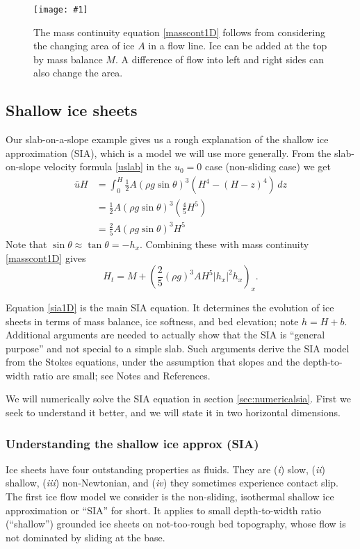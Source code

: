 \documentclass[titlepage,letterpaper,final,12pt]{scrartcl}
\newcommand{\onefigsize}[3]{
\begin{figure}[ht]
\centering
\texttt{[image: \#1]}
\caption{#2}
\label{fig:#1}
\end{figure}}
\newcommand{\onefig}[2]{\onefigsize{#1}{#2}{3.0in}}
\begin{document}
\onefig{slabmasscontfig}{The mass continuity equation \eqref{masscont1D} follows from considering the changing area of ice $A$ in a flow line.  Ice can be added at the top by mass balance $M$.  A difference of flow into left and right sides can also change the area.}


\subsection{Shallow ice sheets}  Our slab-on-a-slope example gives us a rough explanation of the shallow ice approximation (SIA), which is a model we will use more generally.  From the slab-on-slope velocity formula \eqref{uslab} in the $u_0=0$ case (non-sliding case) we get
\begin{align*}
\bar u H &= \int_0^H \frac{1}{2} A (\rho g \sin\theta)^3  \left(H^4 - (H-z)^4\right)\,dz \\
	&= \frac{1}{2} A (\rho g \sin\theta)^3  \left(\frac{4}{5} H^5\right) \\
	&= \frac{2}{5} A (\rho g \sin\theta)^3 H^5
\end{align*}
Note that $\sin \theta \approx \tan\theta = - h_x$.  Combining these with mass continuity \eqref{masscont1D} gives
\begin{equation}
  H_t = M + \left(\frac{2}{5} (\rho g)^3 A H^5 |h_x|^2 h_x\right)_x. \label{sia1D}
\end{equation}

Equation \eqref{sia1D} is the main SIA equation.  It determines the evolution of ice sheets in terms of mass balance, ice softness, and bed elevation; note $h=H+b$.  Additional arguments are needed to actually show that the SIA is ``general purpose'' and not special to a simple slab.  Such arguments derive the SIA model from the Stokes equations, under the assumption that slopes and the depth-to-width ratio are small; see Notes and References.

We will numerically solve the SIA equation in section \ref{sec:numericalsia}.  First we seek to understand it better, and we will state it in two horizontal dimensions.

\subsubsection*{Understanding the shallow ice approx (SIA)}  Ice sheets have four outstanding properties as fluids.  They are (\emph{i}) slow, (\emph{ii}) shallow,  (\emph{iii}) non-Newtonian, and (\emph{iv}) they sometimes experience contact slip.  The first ice flow model we consider is the non-sliding, isothermal shallow ice approximation or ``SIA'' for short.  It applies to small depth-to-width ratio (``shallow'') grounded ice sheets on not-too-rough bed topography, whose flow is not dominated by sliding at the base.
\end{document}
